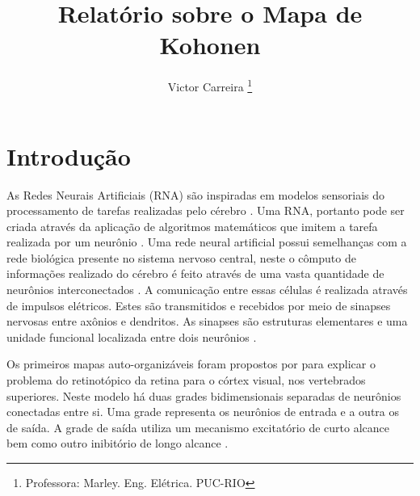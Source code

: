\documentclass[journal, a4paper]{IEEEtran}
\begin{document}
	\title{Relatório sobre o Mapa de Kohonen}
	\author{Victor Carreira
	\thanks{Professora: Marley. Eng. Elétrica. PUC-RIO}}
	\maketitle

\begin{abstract}

\end{abstract}


\section{Introdução}
    As Redes Neurais Artificiais (RNA) são inspiradas em modelos sensoriais do processamento de tarefas realizadas pelo cérebro \citep{Hagan1996}. Uma RNA, portanto pode ser criada através da aplicação de algoritmos matemáticos que imitem a tarefa realizada por um neurônio \citep{Nedjah2016}. Uma rede neural artificial possui semelhanças com a rede biológica presente no sistema nervoso central, neste o cômputo de informações realizado do cérebro é feito através de uma vasta quantidade de neurônios interconectados \citep{Feldman1988,Poulton2002}. A comunicação entre essas células é realizada através de impulsos elétricos. Estes são transmitidos e recebidos por meio de sinapses nervosas entre axônios e dendritos. As sinapses são estruturas elementares e uma unidade funcional localizada entre dois neurônios \citep{Krogh2008}.

	
	Os primeiros mapas auto-organizáveis foram propostos por \citet{Malsburg1976} para explicar o problema do retinotópico da retina para o córtex visual, nos vertebrados superiores. Neste modelo há duas grades bidimensionais separadas de neurônios conectadas entre si. Uma grade representa os neurônios de entrada e a outra os de saída.  A grade de saída  utiliza um mecanismo excitatório de curto alcance bem como outro inibitório de longo alcance \citep{Haykin1999}. 
	
\end{document}
